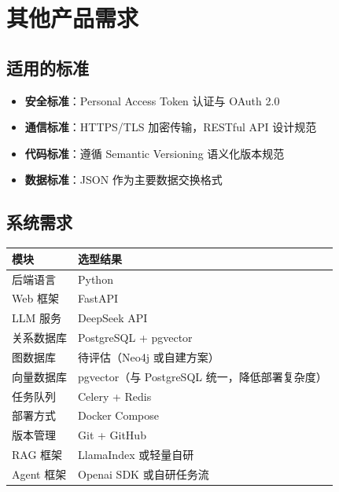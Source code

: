 \documentclass[10pt,a4paper]{article}
\newenvironment{ieeetable}{\begin{center}}{\end{center}}
\begin{document}
\section{其他产品需求}

\subsection{适用的标准}

\begin{itemize}
    \item \textbf{安全标准}：Personal Access Token 认证与 OAuth 2.0
    \item \textbf{通信标准}：HTTPS/TLS 加密传输，RESTful API 设计规范
    \item \textbf{代码标准}：遵循 Semantic Versioning 语义化版本规范
    \item \textbf{数据标准}：JSON 作为主要数据交换格式
\end{itemize}

\subsection{系统需求}

\begin{ieeetable}
    \begin{tabularx}{\textwidth}{L{3.5cm} X}
        \toprule
        \textbf{模块} & \textbf{选型结果} \\
        \midrule
        后端语言 & Python \\
        \midrule
        Web 框架 & FastAPI \\
        \midrule
        LLM 服务 & DeepSeek API \\
        \midrule
        关系数据库 & PostgreSQL + pgvector \\
        \midrule
        图数据库 & 待评估（Neo4j 或自建方案） \\
        \midrule
        向量数据库 & pgvector（与 PostgreSQL 统一，降低部署复杂度） \\
        \midrule
        任务队列 & Celery + Redis \\
        \midrule
        部署方式 & Docker Compose \\
        \midrule
        版本管理 & Git + GitHub \\
        \midrule
        RAG 框架 & LlamaIndex 或轻量自研 \\
        \midrule
        Agent 框架 & Openai SDK 或自研任务流 \\
        \bottomrule
    \end{tabularx}
\end{ieeetable}
\end{document}
